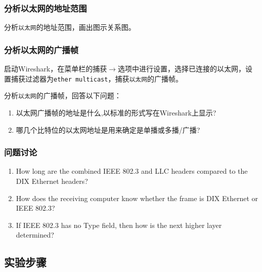 \documentclass{article}
\begin{document}
\subsubsection{分析以太网的地址范围}

分析\texttt{以太网}的地址范围，画出图示关系图。

\subsubsection{分析以太网的广播帧}

启动Wireshark，在菜单栏的捕获\(\to \)选项中进行设置，选择已连接的以太网，设置捕获过滤器为\texttt{ether multicast}，捕获\texttt{以太网}的广播帧。

分析\texttt{以太网}的广播帧，回答以下问题：

\begin{enumerate}[noitemsep]
  \item 以太网广播帧的地址是什么,以标准的形式写在Wireshark上显示?
  \item 哪几个比特位的以太网地址是用来确定是单播或多播/广播?
\end{enumerate}

\subsubsection{问题讨论}

\begin{enumerate}[noitemsep]
  \item How long are the combined IEEE 802.3 and LLC headers compared to the
        DIX Ethernet headers?
  \item How does the receiving computer know whether the frame is DIX Ethernet
        or IEEE 802.3?
  \item If IEEE 802.3 has no Type field, then how is the next higher layer
        determined?
\end{enumerate}


\subsection{实验步骤}
\end{document}
